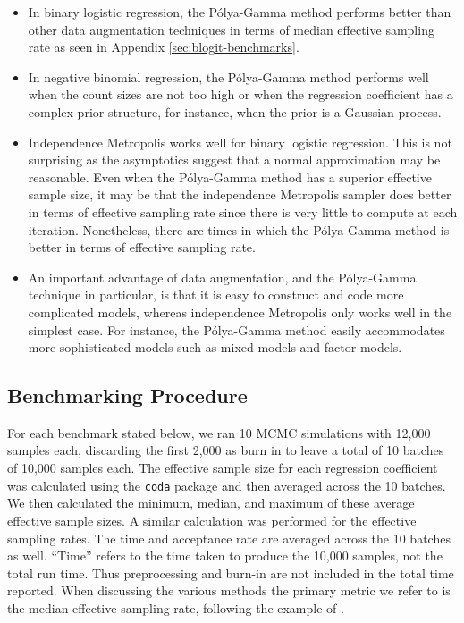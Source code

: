 \documentclass[11pt]{article}
\newcommand{\Polya}{P\'{o}lya}
\begin{document}
\begin{itemize}

\item In binary logistic regression, the \Polya-Gamma method performs better
  than other data augmentation techniques in terms of median effective sampling
  rate as seen in Appendix \ref{sec:blogit-benchmarks}.

\item In negative binomial regression, the \Polya-Gamma method performs well
  when the count sizes are not too high or when the regression coefficient has a
  complex prior structure, for instance, when the prior is a Gaussian process.

\item Independence Metropolis works well for binary logistic regression.  This
  is not surprising as the asymptotics suggest that a normal approximation may
  be reasonable.  Even when the \Polya-Gamma method has a superior effective
  sample size, it may be that the independence Metropolis sampler does better in
  terms of effective sampling rate since there is very little to compute at each
  iteration.  Nonetheless, there are times in which the \Polya-Gamma method is
  better in terms of effective sampling rate.

\item An important advantage of data augmentation, and the \Polya-Gamma
  technique in particular, is that it is easy to construct and code more
  complicated models, whereas independence Metropolis only works well in the
  simplest case.  For instance, the \Polya-Gamma method easily accommodates more
  sophisticated models such as mixed models and factor models.

\end{itemize}

\subsection{Benchmarking Procedure}

For each benchmark stated below, we ran 10 MCMC simulations with 12,000 samples
each, discarding the first 2,000 as burn in to leave a total of 10 batches of
10,000 samples each.  The effective sample size for each regression coefficient
was calculated using the \texttt{coda} package and then averaged across the 10
batches.  We then calculated the minimum, median, and maximum of these average
effective sample sizes.  A similar calculation was performed for the effective
sampling rates.  The time and acceptance rate are averaged across the 10 batches
as well.  ``Time'' refers to the time taken to produce the 10,000 samples, not
the total run time.  Thus preprocessing and burn-in are not included in the
total time reported.  When discussing the various methods the primary metric we
refer to is the median effective sampling rate, following the example of
\cite{fruhwirth-schnatter-fruhwirth-2010}.
\end{document}
